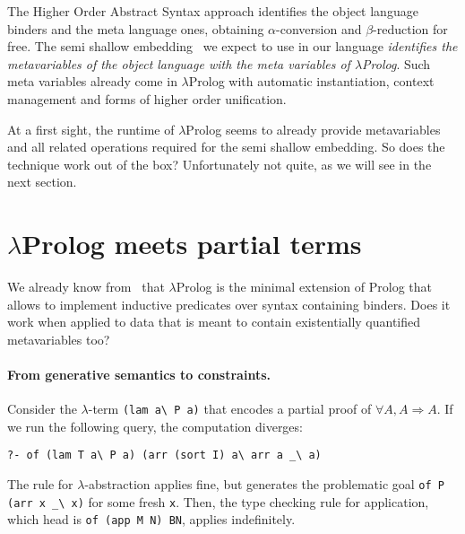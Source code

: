 \documentclass{easychair}
\begin{document}
The Higher Order Abstract Syntax approach identifies the object
language binders and the meta language ones, obtaining $\alpha$-conversion
and $\beta$-reduction for free.  The semi shallow embedding~\cite{holsuperlight} we expect to use in our language
\emph{identifies the metavariables of the object language with the 
meta variables of $\lambda$Prolog}. Such meta variables already
come in $\lambda$Prolog with automatic instantiation, context management and forms of higher order unification.

At a first sight, the runtime of $\lambda$Prolog seems to already provide
metavariables and all related operations required for the semi shallow embedding. So does the technique work out of the box? Unfortunately not quite, as we will see in the next section.

\section{$\lambda$Prolog meets partial terms}\label{sec:problems}

We already know from~\cite{jlp98} that $\lambda$Prolog is the minimal
extension of Prolog that allows to implement inductive predicates over
syntax containing binders. Does it work when applied to data that is
meant to contain existentially quantified metavariables too?

\paragraph{From generative semantics to constraints.} %
\label{sec:delay}

Consider the $\lambda$-term \verb+(lam a\ P a)+ that encodes a
partial proof of $\forall A, A \Rightarrow A$.
If we run the following query, the computation diverges:

\begin{Verbatim}
?- of (lam T a\ P a) (arr (sort I) a\ arr a _\ a)
\end{Verbatim}

The rule for $\lambda$-abstraction applies fine, but generates the problematic
goal \verb+of P (arr x _\ x)+ for some fresh \verb+x+.  Then, the type checking
rule for application, which head is \verb+of (app M N) BN+, applies
indefinitely.  
\end{document}
